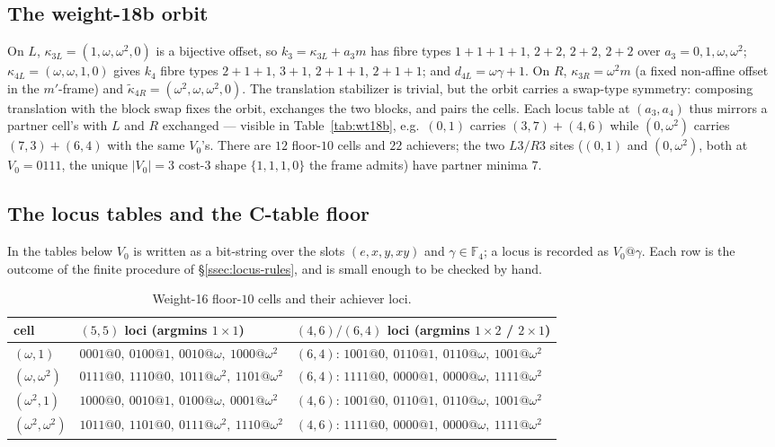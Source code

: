 \documentclass[11pt]{article}
\newcommand{\F}[1]{\mathbb{F}_{#1}}
\theoremstyle{plain}
\theoremstyle{definition}
\theoremstyle{remark}
\begin{document}
\subsection{The weight-18b orbit}\label{ssec:wt18b}

On $L$, $\kappa_{3L}=(1,\omega,\omega^2,0)$ is a bijective offset, so
$k_3=\kappa_{3L}+a_3 m$ has fibre types $1{+}1{+}1{+}1$, $2{+}2$, $2{+}2$, $2{+}2$ over
$a_3=0,1,\omega,\omega^2$; $\kappa_{4L}=(\omega,\omega,1,0)$ gives $k_4$ fibre types
$2{+}1{+}1$, $3{+}1$, $2{+}1{+}1$, $2{+}1{+}1$; and $d_{4L}=\omega\gamma+1$. On $R$,
$\kappa_{3R}=\omega^2 m$ (a fixed non-affine offset in the $m'$-frame) and
$\tilde\kappa_{4R}=(\omega^2,\omega,\omega^2,0)$. The translation stabilizer is trivial, but
the orbit carries a swap-type symmetry: composing translation with the block swap fixes the
orbit, exchanges the two blocks, and pairs the cells. Each locus table at $(a_3,a_4)$ thus
mirrors a partner cell's with $L$ and $R$ exchanged --- visible in Table~\ref{tab:wt18b},
e.g.\ $(0,1)$ carries $(3,7)+(4,6)$ while $(0,\omega^2)$ carries $(7,3)+(6,4)$ with the same
$V_0$'s. There are $12$ floor-$10$ cells and $22$ achievers; the two $L3/R3$ sites
($(0,1)$ and $(0,\omega^2)$, both at $V_0=0111$, the unique $|V_0|=3$ cost-$3$ shape
$\{1,1,1,0\}$ the frame admits) have partner minima $7$.

\subsection{The locus tables and the C-table floor}\label{ssec:wt1618-tables}

In the tables below $V_0$ is written as a bit-string over the slots $(e,x,y,xy)$ and
$\gamma\in\F4$; a locus is recorded as $V_0@\gamma$. Each row is the outcome of the finite
procedure of \S\ref{ssec:locus-rules}, and is small enough to be checked by hand.

\begin{table}[h]
\centering
\caption{Weight-16 floor-$10$ cells and their achiever loci.}
\label{tab:wt16}
\begin{tabular}{lll}
\toprule
cell & $(5,5)$ loci (argmins $1\times1$) & $(4,6)/(6,4)$ loci (argmins $1\times2$ / $2\times1$)\\
\midrule
$(\omega,1)$        & $0001@0,\ 0100@1,\ 0010@\omega,\ 1000@\omega^2$ & $(6,4)$: $1001@0,\ 0110@1,\ 0110@\omega,\ 1001@\omega^2$\\
$(\omega,\omega^2)$ & $0111@0,\ 1110@0,\ 1011@\omega^2,\ 1101@\omega^2$ & $(6,4)$: $1111@0,\ 0000@1,\ 0000@\omega,\ 1111@\omega^2$\\
$(\omega^2,1)$      & $1000@0,\ 0010@1,\ 0100@\omega,\ 0001@\omega^2$ & $(4,6)$: $1001@0,\ 0110@1,\ 0110@\omega,\ 1001@\omega^2$\\
$(\omega^2,\omega^2)$ & $1011@0,\ 1101@0,\ 0111@\omega^2,\ 1110@\omega^2$ & $(4,6)$: $1111@0,\ 0000@1,\ 0000@\omega,\ 1111@\omega^2$\\
\bottomrule
\end{tabular}
\end{table}
\end{document}
